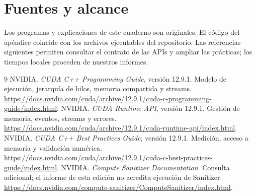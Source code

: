 \chapter{Fuentes y alcance}
Los programas y explicaciones de este cuaderno son originales. El código del apéndice coincide con los archivos ejecutables del repositorio. Las referencias siguientes permiten consultar el contrato de las APIs y ampliar las prácticas; los tiempos locales proceden de nuestros informes.

\begin{thebibliography}{9}
 NVIDIA. \emph{CUDA C++ Programming Guide}, versión 12.9.1. Modelo de ejecución, jerarquía de hilos, memoria compartida y streams. \url{https://docs.nvidia.com/cuda/archive/12.9.1/cuda-c-programming-guide/index.html}.
 NVIDIA. \emph{CUDA Runtime API}, versión 12.9.1. Gestión de memoria, eventos, streams y errores. \url{https://docs.nvidia.com/cuda/archive/12.9.1/cuda-runtime-api/index.html}.
 NVIDIA. \emph{CUDA C++ Best Practices Guide}, versión 12.9.1. Medición, acceso a memoria y validación numérica. \url{https://docs.nvidia.com/cuda/archive/12.9.1/cuda-c-best-practices-guide/index.html}.
 NVIDIA. \emph{Compute Sanitizer Documentation}. Consulta adicional; el informe de esta edición no acredita ejecución de Sanitizer. \url{https://docs.nvidia.com/compute-sanitizer/ComputeSanitizer/index.html}.
\end{thebibliography}

